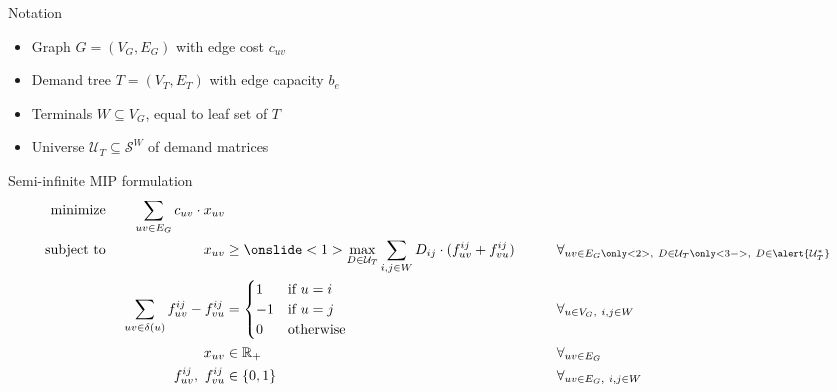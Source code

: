 \documentclass[aspectratio=149]{beamer}
\begin{document}
    \begin{frame}{Notation}
        \begin{itemize}
            \item Graph $G = (V_G, E_G)$ with edge cost $c_{uv}$
            \item Demand tree $T = (V_T, E_T)$ with edge capacity $b_e$
            \item Terminals $W \subseteq V_G$, equal to leaf set of $T$
            \item Universe $\mathcal U_T \subseteq \mathcal S^W$ of demand matrices
        \end{itemize}
    \end{frame}

    \begin{frame}{Semi-infinite MIP formulation}
        \setlength{\TPHorizModule}{\textwidth}%
        \setlength{\TPVertModule}{\textwidth}%
        \vspace*{-3em}
        \begin{alignat*}{5}
            \text{minimize}\ && \sum_{uv \in E_G} c_{uv} \cdot x_{uv} &&& \\
            \text{subject to}\ && x_{uv} &\ge \onslide<1>{\max_{D \in \mathcal U_T}} \sum_{i,j \in W} D_{ij} \cdot (f_{uv}^{ij} + f_{vu}^{ij}) &&\qquad \forall_{uv \in E_G\only<2>{,\ D \in \mathcal U_T}\only<3->{,\ D \in \alert{\mathcal U^*_T}}} \\
            && \sum_{uv \in \delta(u)} f_{uv}^{ij} - f_{vu}^{ij} &= \begin{cases}
                                         1 & \text{if $u = i$} \\
                                         -1 & \text{if $u = j$} \\
                                         0 & \text{otherwise}
            \end{cases} &&\qquad \forall_{u \in V_G,\ i,j \in W} \\
            && x_{uv} &\in \mathbb{R}_+ &&\qquad \forall_{uv \in E_G} \\
            && f_{uv}^{ij},\ f_{vu}^{ij} &\in \{ 0, 1 \} &&\qquad \forall_{uv \in E_G,\ i,j \in W}
        \end{alignat*}%
\end{frame}
\end{document}
